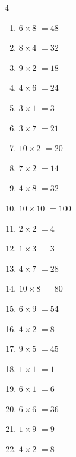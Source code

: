 \begin{multicols}{4}
\begin{enumerate}
  \item $6\times 8$
        $=48$

  \item $8\times 4$
        $=32$

  \item $9\times 2$
        $=18$

  \item $4\times 6$
        $=24$

  \item $3\times 1$
        $=3$

  \item $3\times 7$
        $=21$

  \item $10\times 2$
        $=20$

  \item $7\times 2$
        $=14$

  \item $4\times 8$
        $=32$

  \item $10\times 10$
        $=100$

  \item $2\times 2$
        $=4$

  \item $1\times 3$
        $=3$

  \item $4\times 7$
        $=28$

  \item $10\times 8$
        $=80$

  \item $6\times 9$
        $=54$

  \item $4\times 2$
        $=8$

  \item $9\times 5$
        $=45$

  \item $1\times 1$
        $=1$

  \item $6\times 1$
        $=6$

\columnbreak %

\resetques

  \item $6\times 6$
        $=36$

  \item $1\times 9$
        $=9$

  \item $4\times 2$
        $=8$


\end{enumerate}
\end{multicols}

